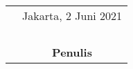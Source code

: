 \documentclass{jtetiskripsi}
\begin{document}
\begin{tabular}{p{7.5cm}c}
	&Jakarta, 2 Juni 2021\\
	&\\
	&\\
	&\\
	&\\
	&\textbf{Penulis}
\end{tabular}


	
	
\end{document}
